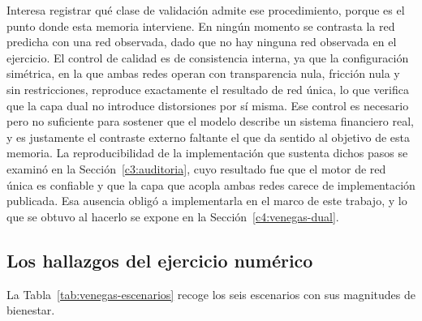 Interesa registrar qué clase de validación admite ese procedimiento, porque es el punto donde esta memoria interviene. En ningún momento se contrasta la red predicha con una red observada, dado que no hay ninguna red observada en el ejercicio. El control de calidad es de consistencia interna, ya que la configuración simétrica, en la que ambas redes operan con transparencia nula, fricción nula y sin restricciones, reproduce exactamente el resultado de red única, lo que verifica que la capa dual no introduce distorsiones por sí misma. Ese control es necesario pero no suficiente para sostener que el modelo describe un sistema financiero real, y es justamente el contraste externo faltante el que da sentido al objetivo de esta memoria. La reproducibilidad de la implementación que sustenta dichos pasos se examinó en la Sección~\ref{c3:auditoria}, cuyo resultado fue que el motor de red única es confiable y que la capa que acopla ambas redes carece de implementación publicada. Esa ausencia obligó a implementarla en el marco de este trabajo, y lo que se obtuvo al hacerlo se expone en la Sección~\ref{c4:venegas-dual}.

\subsection{Los hallazgos del ejercicio numérico}
\label{c4:venegas-hallazgos}

La Tabla~\ref{tab:venegas-escenarios} recoge los seis escenarios con sus magnitudes de bienestar.

